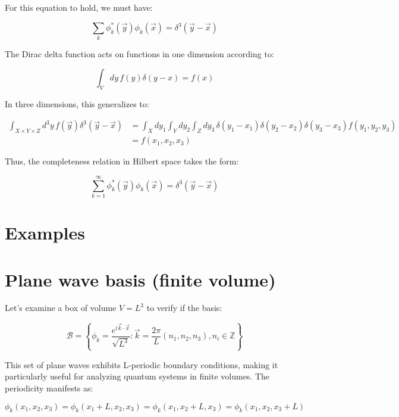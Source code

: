 For this equation to hold, we must have:

\begin{equation}
\sum_k \phi_k^*(\vec{y})\phi_k(\vec{x}) = \delta^3(\vec{y}-\vec{x})
\end{equation}

The Dirac delta function acts on functions in one dimension according to:

\begin{equation}
\int_V dy\, f(y)\delta(y-x) = f(x)
\end{equation}

In three dimensions, this generalizes to:

\begin{align}
\int_{X \times Y \times Z} d^3y\, f(\vec{y})\delta^3(\vec{y}-\vec{x}) &= \int_X dy_1 \int_Y dy_2 \int_Z dy_3\, \delta(y_1-x_1)\delta(y_2-x_2)\delta(y_3-x_3)f(y_1,y_2,y_3) \\
&= f(x_1,x_2,x_3)
\end{align}

Thus, the completeness relation in Hilbert space takes the form:

\begin{equation}
\sum_{k=1}^{\infty} \phi_k^*(\vec{y})\phi_k(\vec{x}) = \delta^3(\vec{y}-\vec{x})
\end{equation}

\section{Examples}
\section{Plane wave basis (finite volume)}
Let's examine a box of volume $V = L^3$ to verify if the basis:


\begin{equation}
\mathcal{B} = \left\{\phi_k = \frac{e^{i\vec{k}\cdot\vec{x}}}{\sqrt{L^3}}: \vec{k} = \frac{2\pi}{L}(n_1, n_2, n_3), n_i \in \mathbb{Z}\right\}
\end{equation}

This set of plane waves exhibits L-periodic boundary conditions, making it particularly useful for analyzing quantum systems in finite volumes. The periodicity manifests as:

\begin{equation}
\phi_k(x_1, x_2, x_3) = \phi_k(x_1+L, x_2, x_3) = \phi_k(x_1, x_2+L, x_3) = \phi_k(x_1, x_2, x_3+L)
\end{equation}

